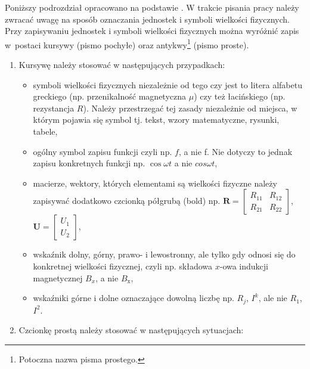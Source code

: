 \documentclass[12pt,twoside,openright]{article}
\begin{document}
Poniższy podrozdział opracowano na podstawie \cite{Pawluk2001}. W trakcie pisania pracy należy zwracać uwagę na sposób oznaczania jednostek i symboli wielkości fizycznych. Przy zapisywaniu jednostek i symboli wielkości fizycznych można wyróżnić zapis w~postaci kursywy (pismo pochyłe) oraz antykwy\footnote{Potoczna nazwa pisma prostego.} (pismo proste). 

\begin{enumerate}[label=\arabic*), leftmargin=1.25cm]
\item Kursywę należy stosować w następujących przypadkach:

\begin{itemize}[label={--},labelsep=0.4cm,leftmargin=0.6cm] %
\item symboli wielkości fizycznych niezależnie od tego czy jest to litera alfabetu greckiego (np. przenikalność magnetyczna $\mu$) czy też łacińskiego (np. rezystancja $R$). Należy przestrzegać tej zasady niezależnie od miejsca, w którym pojawia się symbol tj. tekst, wzory matematyczne, rysunki, tabele,

\item ogólny symbol zapisu funkcji czyli np. $f$, a nie f. Nie dotyczy to jednak zapisu konkretnych funkcji np. $\cos \omega t$ a nie $cos \omega t$,

\item macierze, wektory, których elementami są wielkości fizyczne należy zapisywać dodatkowo czcionką półgrubą (bold) np. 
$\bm{R} = \left[ 
\begin{array}{cc}
R_{11} & R_{12} \\
R_{21} & R_{22} 
\end{array} 
\right]$,
$\bm{U} = \left[ 
\begin{array}{c}
U_{1} \\
U_{2} 
\end{array} 
\right]$,

\item wskaźnik dolny, górny, prawo- i lewostronny, ale tylko gdy odnosi się do konkretnej wielkości fizycznej, czyli np. składowa $x$-owa indukcji magnetycznej $B_x$, a nie $B_{\mathrm{x}}$,

\item wskaźniki górne i dolne oznaczające dowolną liczbę np. $R_j$, $I^k$, ale nie $R_\mathit{1}$, $I^\mathit{2}$.

\end{itemize}

\item Czcionkę prostą należy stosować w następujących sytuacjach:


\end{enumerate}
\end{document}
